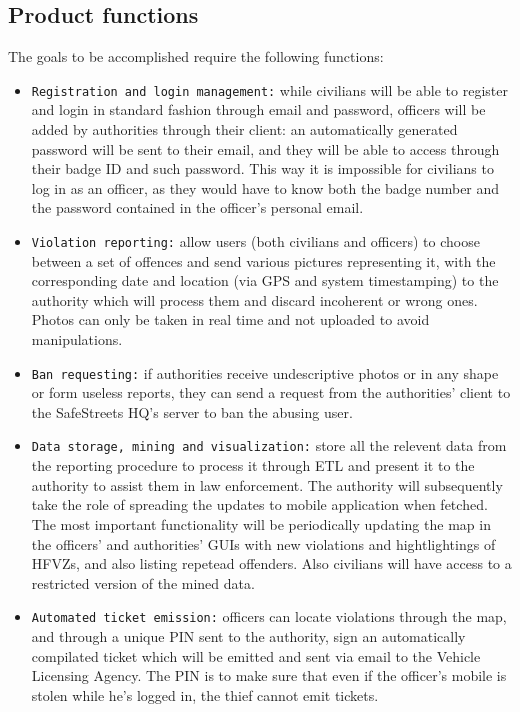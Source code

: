 \documentclass[12pt,a4paper]{article}
\begin{document}
\subsection{Product functions}
The goals to be accomplished require the following functions:
 \begin{itemize}
\item \texttt{Registration and login management:} while civilians will be able to register and login in standard fashion through email and password, officers will be added by authorities through their client: an automatically generated password will be sent to their email, and they will be able to access through their badge ID and such password. This way it is impossible for civilians to log in as an officer, as they would have to know both the badge number and the password contained in the officer's personal email.

\item \texttt{Violation reporting:} allow users (both civilians and officers) to choose between a set of offences and send various pictures representing it, with the corresponding date and location (via GPS and system timestamping) to the authority which will process them and discard incoherent or wrong ones. Photos can only be taken in real time and not uploaded to avoid manipulations.

\item \texttt{Ban requesting:} if authorities receive undescriptive photos or in any shape or form useless reports, they can send a request from the authorities' client to the SafeStreets HQ's server to ban the abusing user.

\item  \texttt{Data storage, mining and visualization:} store all the relevent data from the reporting procedure to process it through ETL and present it to the authority to assist them in law enforcement. The authority will subsequently take the role of spreading the updates to mobile application when fetched. The most important functionality will be periodically updating the map in the officers' and authorities' GUIs with new violations and hightlightings of HFVZs, and also listing repetead offenders. Also civilians will have access to a restricted version of the mined data.

\item  \texttt{Automated ticket emission:} officers can locate violations through the map, and through a unique PIN sent to the authority, sign an automatically compilated ticket which will be emitted and sent via email to the Vehicle Licensing Agency. The PIN is to make sure that even if the officer's mobile is stolen while he's logged in, the thief cannot emit tickets.
\end{itemize}
\newpage
\end{document}
